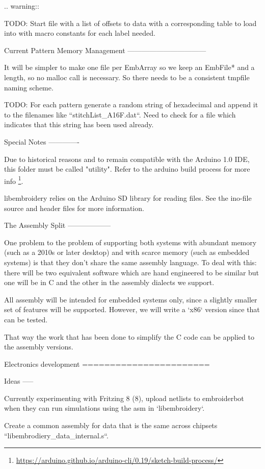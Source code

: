 \documentclass[a4paper]{report}
\begin{document}
{{{{{.. warning::

   TODO: Start file with a list of offsets to data with a corresponding table
   to load into with macro constants for each label needed.

Current Pattern Memory Management
---------------------------------

It will be simpler to make one file per EmbArray so we keep an EmbFile*
and a length, so no malloc call is necessary. So there needs to be a consistent
tmpfile naming scheme.

TODO: For each pattern generate a random string of hexadecimal and append it
to the filenames like ``stitchList_A16F.dat``. Need to check for a file
which indicates that this string has been used already.

Special Notes
-------------

Due to historical reasons and to remain compatible with the Arduino 1.0
IDE, this folder must be called "utility". Refer to the arduino build
process for more info
\footnote{\url{https://arduino.github.io/arduino-cli/0.19/sketch-build-process/}}.

libembroidery relies on the Arduino SD library for reading files. See
the ino-file source and header files for more information.

The Assembly Split
------------------

One problem to the problem of supporting both systems with abundant memory
(such as a 2010s or later desktop) and with scarce memory (such as embedded
systems) is that they don't share the same assembly language. To deal with
this: there will be two equivalent software which are hand engineered to be
similar but one will be in C and the other in the assembly dialects we support.

All assembly will be intended for embedded systems only, since a slightly
smaller set of features will be supported. However, we will write a
`x86` version since that can be tested.

That way the work that has been done to simplify the C code can be applied
to the assembly versions.

Electronics development
=======================

Ideas
-----

Currently experimenting with Fritzing 8 (8), upload netlists to embroiderbot when
they can run simulations using the asm in `libembroidery`.

Create a common assembly for data that is the same across chipsets
``libembrodiery_data_internal.s``.

}}}}}
\end{document}
